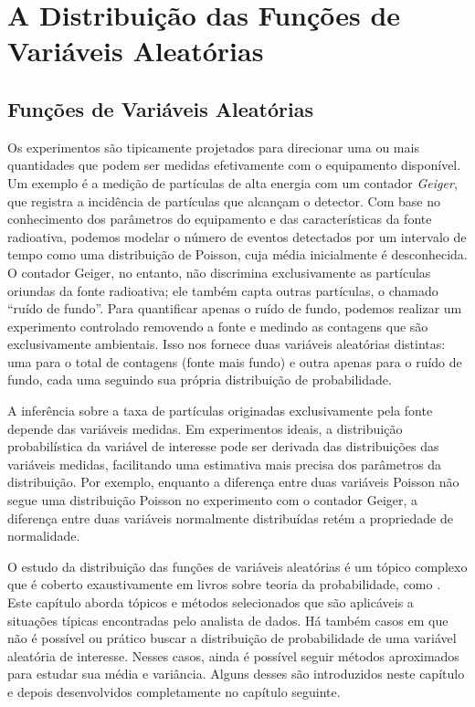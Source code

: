 \chapter{A Distribuição das Funções de Variáveis Aleatórias}

\section{Funções de Variáveis Aleatórias}

Os experimentos são tipicamente projetados para direcionar uma ou mais quantidades que podem ser medidas efetivamente com o equipamento disponível. Um exemplo é a medição de partículas de alta energia com um contador \textit{Geiger}, que registra a incidência de partículas que alcançam o detector. Com base no conhecimento dos parâmetros do equipamento e das características da fonte radioativa, podemos modelar o número de eventos detectados por um intervalo de tempo como uma distribuição de Poisson, cuja média inicialmente é desconhecida. O contador Geiger, no entanto, não discrimina exclusivamente as partículas oriundas da fonte radioativa; ele também capta outras partículas, o chamado ``ruído de fundo''. Para quantificar apenas o ruído de fundo, podemos realizar um experimento controlado removendo a fonte e medindo as contagens que são exclusivamente ambientais. Isso nos fornece duas variáveis aleatórias distintas: uma para o total de contagens (fonte mais fundo) e outra apenas para o ruído de fundo, cada uma seguindo sua própria distribuição de probabilidade.

A inferência sobre a taxa de partículas originadas exclusivamente pela fonte depende das variáveis medidas. Em experimentos ideais, a distribuição probabilística da variável de interesse pode ser derivada das distribuições das variáveis medidas, facilitando uma estimativa mais precisa dos parâmetros da distribuição. Por exemplo, enquanto a diferença entre duas variáveis Poisson não segue uma distribuição Poisson no experimento com o contador Geiger, a diferença entre duas variáveis normalmente distribuídas retém a propriedade de normalidade.

O estudo da distribuição das funções de variáveis aleatórias é um tópico complexo que é coberto exaustivamente em livros sobre teoria da probabilidade, como \citet{ross2019introduction}. Este capítulo aborda tópicos e métodos selecionados que são aplicáveis a situações típicas encontradas pelo analista de dados. Há também casos em que não é possível ou prático buscar a distribuição de probabilidade de uma variável aleatória de interesse. Nesses casos, ainda é possível seguir métodos aproximados para estudar sua média e variância. Alguns desses são introduzidos neste capítulo e depois desenvolvidos completamente no capítulo seguinte.

